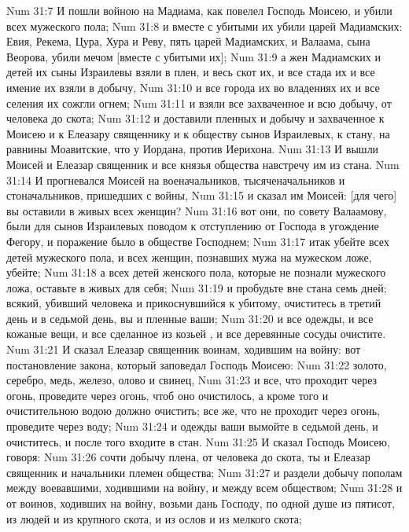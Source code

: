 \vs Num 31:7 И пошли войною на Мадиама, как повелел Господь Моисею, и убили всех мужеского пола;
\vs Num 31:8 и вместе с убитыми их убили царей Мадиамских: Евия, Рекема, Цура, Хура и Реву, пять царей Мадиамских, и Валаама, сына Веорова, убили мечом [вместе с убитыми их];
\vs Num 31:9 а жен Мадиамских и детей их сыны Израилевы взяли в плен, и весь скот их, и все стада их и все имение их взяли в добычу,
\vs Num 31:10 и все города их во владениях их и все селения их сожгли огнем;
\vs Num 31:11 и взяли все захваченное и всю добычу, от человека до скота;
\vs Num 31:12 и доставили пленных и добычу и захваченное к Моисею и к Елеазару священнику и к обществу сынов Израилевых, к стану, на равнины Моавитские, что у Иордана, против Иерихона.
\vs Num 31:13 И вышли Моисей и Елеазар священник и все князья общества навстречу им из стана.
\vs Num 31:14 И прогневался Моисей на военачальников, тысяченачальников и стоначальников, пришедших с войны,
\vs Num 31:15 и сказал им Моисей: [для чего] вы оставили в живых всех женщин?
\vs Num 31:16 вот они, по совету Валаамову, были для сынов Израилевых поводом к отступлению от Господа в угождение Фегору,  и поражение было в обществе Господнем;
\vs Num 31:17 итак убейте всех детей мужеского пола, и всех женщин, познавших мужа на мужеском ложе, убейте;
\vs Num 31:18 а всех детей женского пола, которые не познали мужеского ложа, оставьте в живых для себя;
\vs Num 31:19 и пробудьте вне стана семь дней; всякий, убивший человека и прикоснувшийся к убитому, очиститесь в третий день и в седьмой день, вы и пленные ваши;
\vs Num 31:20 и все одежды, и все кожаные вещи, и все сделанное из козьей , и все деревянные сосуды очистите.
\vs Num 31:21 И сказал Елеазар священник воинам, ходившим на войну: вот постановление закона, который заповедал Господь Моисею:
\vs Num 31:22 золото, серебро, медь, железо, олово и свинец,
\vs Num 31:23 и все, что проходит через огонь, проведите через огонь, чтоб оно очистилось, а кроме того и очистительною водою должно очистить; все же, что не проходит через огонь, проведите через воду;
\vs Num 31:24 и одежды ваши вымойте в седьмой день, и очиститесь, и после того входите в стан.
\rsbpar\vs Num 31:25 И сказал Господь Моисею, говоря:
\vs Num 31:26 сочти добычу плена, от человека до скота, ты и Елеазар священник и начальники племен общества;
\vs Num 31:27 и раздели добычу пополам между воевавшими, ходившими на войну, и между всем обществом;
\vs Num 31:28 и от воинов, ходивших на войну, возьми дань Господу, по одной душе из пятисот, из людей и из крупного скота, и из ослов и из мелкого скота;
